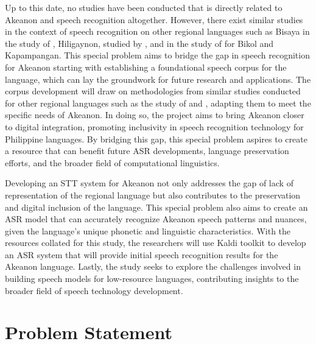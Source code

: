 Up to this date, no studies have been conducted that is directly related to Akeanon and speech recognition altogether. However, there exist similar studies in the context of speech recognition on other regional languages such as Bisaya in the study of , Hiligaynon, studied by , and in the study of  for Bikol and Kapampangan. This special problem aims to bridge the gap in speech recognition for Akeanon starting with establishing a foundational speech corpus for the language, which can lay the groundwork for future research and applications. The corpus development will draw on methodologies from similar studies conducted for other regional languages such as the study of  and , adapting them to meet the specific needs of Akeanon. In doing so, the project aims to bring Akeanon closer to digital integration, promoting inclusivity in speech recognition technology for Philippine languages. By bridging this gap, this special problem aspires to create a resource that can benefit future ASR developments, language preservation efforts, and the broader field of computational linguistics.

Developing an STT system for Akeanon not only addresses the gap of lack of representation of the regional language but also contributes to the preservation and digital inclusion of the language. This special problem also aims to create an ASR model that can accurately recognize Akeanon speech patterns and nuances, given the language’s unique phonetic and linguistic characteristics. With the resources collated for this study, the researchers will use Kaldi toolkit to develop an ASR system that will provide initial speech recognition results for the Akeanon language. Lastly, the study seeks to explore the challenges involved in building speech models for low-resource languages, contributing insights to the broader field of speech technology development.


\section{Problem Statement}
\label{sec:problemstatement}

